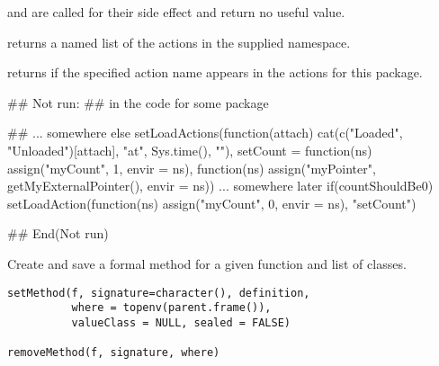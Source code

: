 %
\begin{Value}
  and  are called for their side effect and return no
useful value.

 returns a named list of the actions in the
supplied namespace.

 returns  if the specified action
name appears in the actions for this package.
\end{Value}
%
\begin{Examples}
\begin{ExampleCode}
## Not run: 
## in the code for some package

## ... somewhere else
setLoadActions(function(attach)
   cat(c("Loaded", "Unloaded")[attach], "at", Sys.time(), "\n"),
  setCount = function(ns) assign("myCount", 1, envir = ns),
  function(ns) assign("myPointer", getMyExternalPointer(), envir = ns))
  ... somewhere later
if(countShouldBe0)
  setLoadAction(function(ns) assign("myCount", 0, envir = ns), "setCount")

## End(Not run)
\end{ExampleCode}
\end{Examples}
%
\begin{Description}\relax
Create and save a formal method for a given function and list of classes.
\end{Description}
%
\begin{Usage}
\begin{verbatim}
setMethod(f, signature=character(), definition,
          where = topenv(parent.frame()),
          valueClass = NULL, sealed = FALSE)

removeMethod(f, signature, where)
\end{verbatim}
\end{Usage}
%
